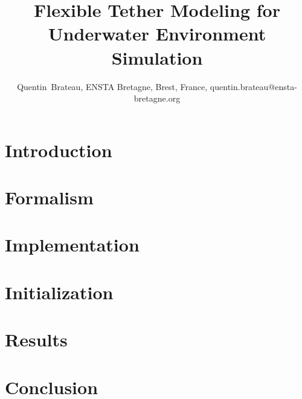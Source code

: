 \documentclass[10pt, journal, twoside]{IEEEtran}
\begin{document}
	\title{Flexible Tether Modeling for Underwater Environment Simulation}
	\author{Quentin~Brateau, ENSTA Bretagne, Brest, France, quentin.brateau@ensta-bretagne.org}


	\maketitle
	\IEEEdisplaynontitleabstractindextext

	\section{Introduction}
	\label{sec:introduction}
	

	\section{Formalism}
	\label{sec:formalism}
	

	\section{Implementation}
	\label{sec:implementation}
	

	\section{Initialization}
	\label{sec:initialization}
	

	\section{Results}
	\label{sec:results}
	

	\section{Conclusion}
	

	
	
\end{document}

